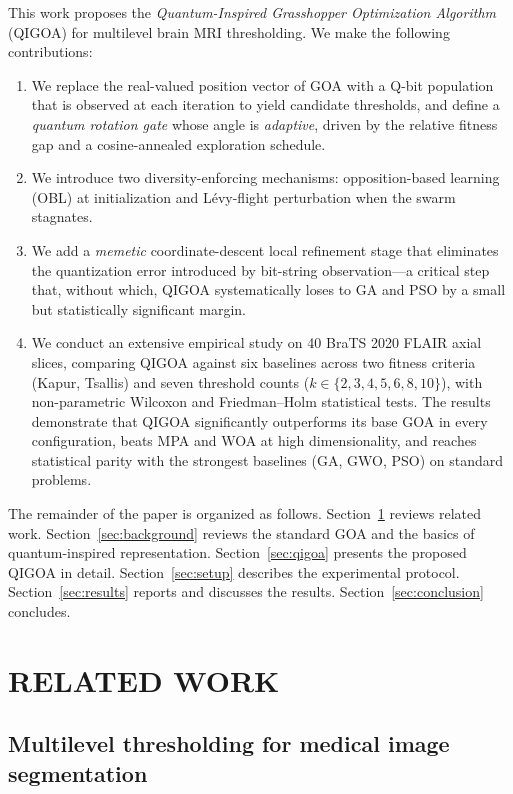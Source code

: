 This work proposes the \emph{Quantum-Inspired Grasshopper Optimization Algorithm} (QIGOA) for multilevel brain MRI thresholding. We make the following contributions:
\begin{enumerate}
  \item We replace the real-valued position vector of GOA with a Q-bit population that is observed at each iteration to yield candidate thresholds, and define a \emph{quantum rotation gate} whose angle is \emph{adaptive}, driven by the relative fitness gap and a cosine-annealed exploration schedule.
  \item We introduce two diversity-enforcing mechanisms: opposition-based learning (OBL) at initialization and L\'evy-flight perturbation when the swarm stagnates.
  \item We add a \emph{memetic} coordinate-descent local refinement stage that eliminates the quantization error introduced by bit-string observation---a critical step that, without which, QIGOA systematically loses to GA and PSO by a small but statistically significant margin.
  \item We conduct an extensive empirical study on 40 BraTS 2020 FLAIR axial slices, comparing QIGOA against six baselines across two fitness criteria (Kapur, Tsallis) and seven threshold counts ($k\in\{2,3,4,5,6,8,10\}$), with non-parametric Wilcoxon and Friedman--Holm statistical tests. The results demonstrate that QIGOA significantly outperforms its base GOA in every configuration, beats MPA and WOA at high dimensionality, and reaches statistical parity with the strongest baselines (GA, GWO, PSO) on standard problems.
\end{enumerate}

The remainder of the paper is organized as follows. Section~\ref{sec:related} reviews related work. Section~\ref{sec:background} reviews the standard GOA and the basics of quantum-inspired representation. Section~\ref{sec:qigoa} presents the proposed QIGOA in detail. Section~\ref{sec:setup} describes the experimental protocol. Section~\ref{sec:results} reports and discusses the results. Section~\ref{sec:conclusion} concludes.

\section{RELATED WORK}\label{sec:related}

\subsection{Multilevel thresholding for medical image segmentation}

